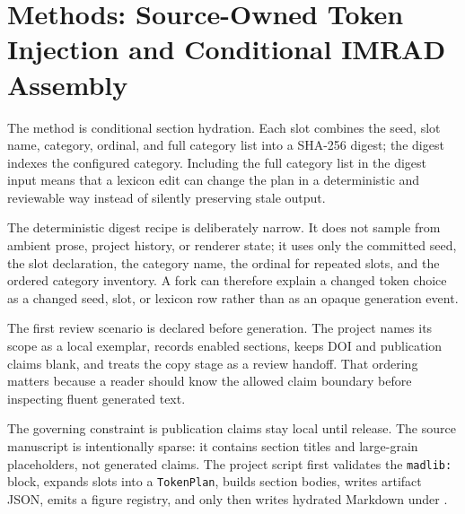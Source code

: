 \documentclass[
  english,
]{article}
\begin{document}
\newpage

\section{Methods: Source-Owned Token Injection and Conditional IMRAD
Assembly}\label{methods-source-owned-token-injection-and-conditional-imrad-assembly}

The method is conditional section hydration. Each slot combines the
seed, slot name, category, ordinal, and full category list into a
SHA-256 digest; the digest indexes the configured category. Including
the full category list in the digest input means that a lexicon edit can
change the plan in a deterministic and reviewable way instead of
silently preserving stale output.

The deterministic digest recipe is deliberately narrow. It does not
sample from ambient prose, project history, or renderer state; it uses
only the committed seed, the slot declaration, the category name, the
ordinal for repeated slots, and the ordered category inventory. A fork
can therefore explain a changed token choice as a changed seed, slot, or
lexicon row rather than as an opaque generation event.

The first review scenario is declared before generation. The project
names its scope as a local exemplar, records enabled sections, keeps DOI
and publication claims blank, and treats the copy stage as a review
handoff. That ordering matters because a reader should know the allowed
claim boundary before inspecting fluent generated text.

The governing constraint is publication claims stay local until release.
The source manuscript is intentionally sparse: it contains section
titles and large-grain placeholders, not generated claims. The project
script first validates the \texttt{madlib:} block, expands slots into a
\texttt{TokenPlan}, builds section bodies, writes artifact JSON, emits a
figure registry, and only then writes hydrated Markdown under
.
\end{document}
